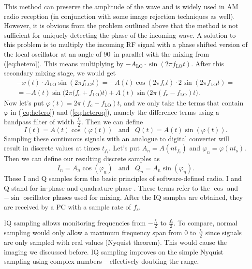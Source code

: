 \documentclass[a4paper,12pt,twoside,openright]{report}
\begin{document}
This method can preserve the amplitude of the wave and is widely used in AM radio reception (in conjunction with some image rejection techniques as well). However, it is obvious from the problem outlined above that the method is not sufficient for uniquely detecting the phase of the incoming wave. A solution to this problem is to multiply the incoming RF signal with a phase shifted version of the local oscillator at an angle of 90\degree\ in parallel with the mixing from (\ref{eq:hetero}). This means multiplying by $-A_\text{LO} \cdot \sin(2 \pi f_\text{LO} t)$. After this secondary mixing stage, we would get
\begin{multline}
\label{eq:heteroq}
- x(t) \cdot A_\text{LO} \sin(2 \pi f_\text{LO} t) =  -A(t) \cos(2 \pi f_\text{c} t) \cdot 2 \sin(2 \pi f_\text{LO} t) = \\
=  - A(t) \sin\big( 2 \pi  (f_\text{c} + f_\text{LO} \big) t\big) + A(t) \sin\big( 2 \pi (f_\text{c} - f_\text{LO}) t \big) .
\end{multline}
Now let's put $\varphi(t) = 2 \pi (f_\text{c}-f_\text{LO}) t$, and we only take the terms that contain $\varphi$ in (\ref{eq:hetero}) and (\ref{eq:heteroq}), namely the difference terms using a bandpass filter of width $\frac{f_\text{s}}{2}$. Then we can define
\begin{equation}
I(t) = A(t) \cos( \varphi (t)) \,\,\,\,\, \text{and} \,\,\,\,\, Q(t) = A(t) \sin( \varphi (t)) .
\end{equation}
Sampling these continuous signals with an analogue to digital converter will result in discrete values at times $t_{f_\text{s}}$. Let's put $A_{n} = A(n t_{f_\text{s}})$ and $\varphi_{n} = \varphi(n t_\text{s})$. Then we can define our resulting discrete samples as
\begin{equation}
I_{n} = A_{n} \cos( \varphi_{n} ) \,\,\,\,\, \text{and} \,\,\,\,\, Q_{n} = A_{n} \sin( \varphi _{n}) .
\end{equation}
These I and Q samples form the basic principles of software-defined radio. I and Q stand for in-phase and quadrature phase \cite{kirkhorn1999introduction}. These terms refer to the $\cos$ and $-\sin$ oscillator phases used for mixing. After the IQ samples are obtained, they are received by a PC with a sample rate of $f_\text{s}$.

IQ sampling allows monitoring frequencies from $-\frac{f_\text{s}}{2}$ to $\frac{f_\text{s}}{2}$. To compare, normal sampling would only allow a maximum frequency span from $0$ to $\frac{f_\text{s}}{2}$ since signals are only sampled with real values (Nyquist theorem). This would cause the imaging we discussed before. IQ sampling improves on the simple Nyquist sampling using complex numbers -- effectively doubling the range.
\end{document}
